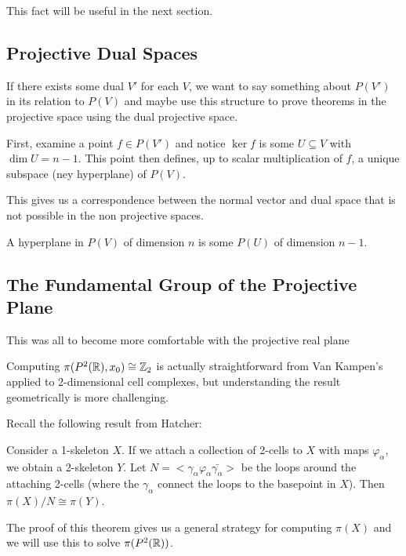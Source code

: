 \documentclass[10pt]{article}
\begin{document}
This fact will be useful in the next section.

\subsection{Projective Dual Spaces}

If there exists some dual $V'$ for each $V$, we want to say something about
$P(V')$ in its relation to $P(V)$ and maybe use this structure to prove
theorems in the projective space using the dual projective space. 

First, examine a point $f \in P(V')$ and notice $\ker f$ is some $U \subseteq
V$ with $\dim U = n-1$. This point then defines, up to scalar multiplication of
$f$, a unique subspace (ney hyperplane) of $P(V)$.

This gives us a correspondence between the normal vector and dual space that is
not possible in the non projective spaces.

\begin{definition}
	A hyperplane in $P(V)$ of dimension $n$ is some $P(U)$ of dimension $n-1$.
\end{definition}

\subsection{The Fundamental Group of the Projective Plane}

This was all to become more comfortable with the projective real plane 

Computing $\pi(P^2(\mathbb{R}), x_0) \cong \mathbb{Z}_2$ is actually straightforward from Van
Kampen's applied to 2-dimensional cell complexes, but understanding the result
geometrically is more challenging.

Recall the following result from Hatcher:

\begin{theorem}
	Consider a 1-skeleton $X$. If we attach a collection of 2-cells to $X$ with
	maps $\varphi_{\alpha}$, we obtain a 2-skeleton $Y$. Let $N = <
\gamma_{\alpha} \varphi_{\alpha} \bar{\gamma_{\alpha}} >$ be the loops around
the attaching 2-cells (where the $\gamma_{\alpha}$ connect the loops to the
basepoint in $X$). Then $\pi(X) / N \cong \pi(Y)$.
\end{theorem}

The proof of this theorem gives us a general strategy for computing $\pi(X)$
and we will use this to solve $\pi(P^2(\mathbb{R}))$.
\end{document}
